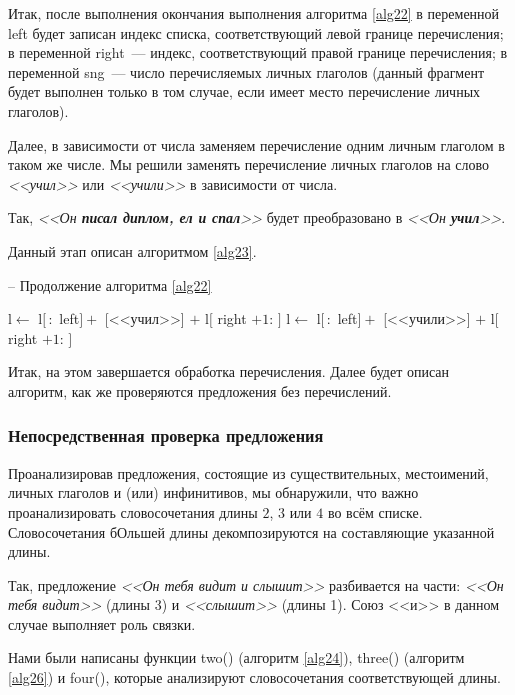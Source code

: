 \documentclass[main]{subfiles}
\begin{document}
Итак, после выполнения окончания выполнения алгоритма \ref{alg22} в переменной left будет записан индекс списка, соответствующий левой границе перечисления; в переменной right~--- индекс, соответствующий правой границе перечисления; в переменной sng~--- число перечисляемых личных глаголов (данный фрагмент будет выполнен только в том случае, если имеет место перечисление личных глаголов).

Далее, в зависимости от числа заменяем перечисление одним личным глаголом в таком же числе. Мы решили заменять перечисление личных глаголов на слово \textit{<<учил>>} или \textit{<<учили>>} в зависимости от числа.

Так, \textit{<<Он \textbf{писал диплом, ел и спал}>>} будет преобразовано в \textit{<<Он \textbf{учил}>>}.

Данный этап описан алгоритмом \ref{alg23}.

\begin{algorithm}
	\caption{-- Продолжение алгоритма \ref{alg22}}\label{alg23}
	\begin{algorithmic}[1]
		\State l$\gets$ l$[\, :$ left$]+$ [<<учил>>] $+$ l$[$ right $+1:\, ]$
		\State l$\gets$ l$[\, :$ left$]+$ [<<учили>>] $+$ l$[$ right $+1:\, ]$
		\EndIf
		\EndIf
	\end{algorithmic}
\end{algorithm}
Итак, на этом завершается обработка перечисления. Далее будет описан алгоритм, как же проверяются предложения без перечислений.
\subsubsection{Непосредственная проверка предложения}
Проанализировав предложения, состоящие из существительных, местоимений, личных глаголов и (или) инфинитивов, мы обнаружили, что важно проанализировать словосочетания длины $2$, $3$ или $4$ во всём списке. Словосочетания бОльшей длины декомпозируются на составляющие указанной длины.

Так, предложение \textit{<<Он тебя видит и слышит>> }разбивается на части: \textit{<<Он тебя видит>>} (длины 3) и \textit{<<слышит>>} (длины 1). Союз <<и>> в данном случае выполняет роль связки.

Нами были написаны функции two() (алгоритм \ref{alg24}), three() (алгоритм \ref{alg26}) и four(), которые анализируют словосочетания соответствующей длины.
\end{document}
